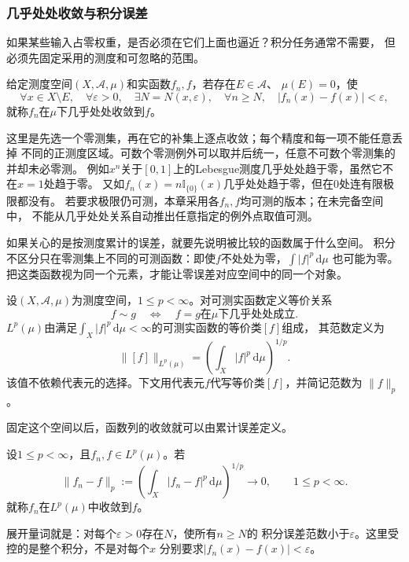 \subsubsection{几乎处处收敛与积分误差}

如果某些输入占零权重，是否必须在它们上面也逼近？积分任务通常不需要，
但必须先固定采用的测度和可忽略的范围。
\begin{definition}[几乎处处收敛]
\label{def:analysis-almost-everywhere-convergence}
给定测度空间$(X,\mathcal A,\mu)$和实函数$f_n,f$，若存在$E\in\mathcal A$、
$\mu(E)=0$，使
\[
 \forall x\in X\setminus E,\quad
 \forall\varepsilon>0,\quad
 \exists N=N(x,\varepsilon),\quad
 \forall n\geq N,\quad |f_n(x)-f(x)|<\varepsilon,
\]
就称$f_n$在$\mu$下几乎处处收敛到$f$。
\end{definition}
这里是先选一个零测集，再在它的补集上逐点收敛；每个精度和每一项不能任意丢掉
不同的正测度区域。可数个零测例外可以取并后统一，任意不可数个零测集的并却未必零测。
例如$x^n$关于$[0,1]$上的Lebesgue测度几乎处处趋于零，虽然它不在$x=1$处趋于零。
又如$f_n(x)=n\mathbb I_{\{0\}}(x)$几乎处处趋于零，但在$0$处连有限极限都没有。
若要求极限仍可测，本章采用各$f_n,f$均可测的版本；在未完备空间中，
不能从几乎处处关系自动推出任意指定的例外点取值可测。

如果关心的是按测度累计的误差，就要先说明被比较的函数属于什么空间。
积分不区分只在零测集上不同的可测函数：即使$f$不处处为零，$\int|f|^p\,\mathrm d\mu$
也可能为零。把这类函数视为同一个元素，才能让零误差对应空间中的同一个对象。
\begin{definition}[$L^p$空间与范数]
\label{def:analysis-lp-space}
设$(X,\mathcal A,\mu)$为测度空间，$1\leq p<\infty$。对可测实函数定义等价关系
\[
  f\sim g\quad\Longleftrightarrow\quad f=g\text{在$\mu$下几乎处处成立}.
\]
$L^p(\mu)$由满足$\int_X|f|^p\,\mathrm d\mu<\infty$的可测实函数的等价类$[f]$组成，
其范数定义为
\[
  \lVert[f]\rVert_{L^p(\mu)}
  =\left(\int_X|f|^p\,\mathrm d\mu\right)^{1/p}.
\]
该值不依赖代表元的选择。下文用代表元$f$代写等价类$[f]$，并简记范数为
$\lVert f\rVert_p$。
\end{definition}

固定这个空间以后，函数列的收敛就可以由累计误差定义。
\begin{definition}[$L^p$收敛]
\label{def:analysis-lp-convergence}
设$1\leq p<\infty$，且$f_n,f\in L^p(\mu)$。若
\begin{equation}
  \lVert f_n-f\rVert_p
  :=
  \left(
    \int_X|f_n-f|^p\,\mathrm{d}\mu
  \right)^{1/p}
  \longrightarrow0,
  \qquad 1\leq p<\infty.
\label{eq:analysis-lp-convergence}
\end{equation}
就称$f_n$在$L^p(\mu)$中收敛到$f$。
\end{definition}
展开量词就是：对每个$\varepsilon>0$存在$N$，使所有$n\geq N$的
积分误差范数小于$\varepsilon$。这里受控的是整个积分，不是对每个$x$
分别要求$|f_n(x)-f(x)|<\varepsilon$。

